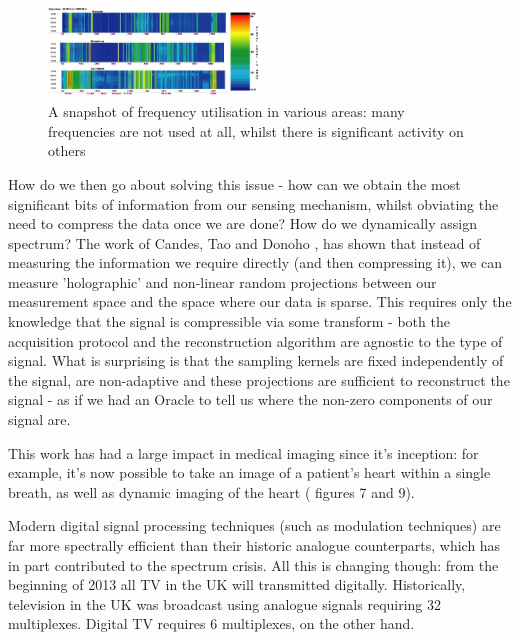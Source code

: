 \documentclass[conference]{IEEEtran}
\begin{document}
\begin{figure}[h]
\centering
\includegraphics[height = 7 cm, width=0.5\textwidth]{cr2.jpg}
\caption{A snapshot of frequency utilisation in various areas: many frequencies are not used at all, whilst there is significant activity on others \cite{Burbidge2007}}
\label{frequtil}
\end{figure}

How do we then go about solving this issue - how can we obtain the most significant bits of information from our sensing mechanism, whilst obviating the need to compress the data once we are done? How do we dynamically assign spectrum? The work of Candes, Tao \cite{Candes2006} and Donoho \cite{Donoho2006}, has shown that instead of measuring the information we require directly (and then compressing it), we can measure 'holographic' and non-linear random projections between our measurement space and the space where our data is sparse. This requires only the knowledge that the signal is compressible via some transform - both the acquisition protocol and the reconstruction algorithm are agnostic to the type of signal. What is surprising is that the sampling kernels are fixed independently of the signal, are non-adaptive and these projections are sufficient to reconstruct the signal - as if we had an Oracle to tell us where the non-zero components of our signal are. 

This work has had a large impact in medical imaging since it's inception: for example, it's now possible to take an image of a patient's heart within a single breath, as well as dynamic imaging of the heart (\cite{Donoho} figures 7 and 9).

Modern digital signal processing techniques (such as modulation techniques) are far more spectrally efficient than their historic analogue counterparts, which has in part contributed to the spectrum crisis. All this is changing though: from the beginning of 2013 all TV in the UK will transmitted digitally. Historically, television in the UK was broadcast using analogue signals requiring 32 multiplexes. Digital TV requires 6 multiplexes, on the other hand. 
\end{document}
